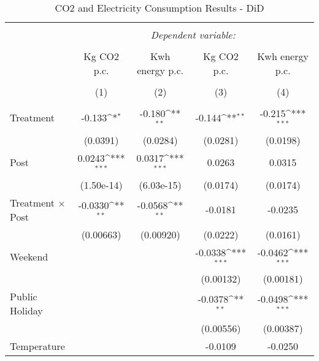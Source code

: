 \def\sym#1{\ifmmode^{#1}\else\(^{#1}\)\fi}

\begin{table}[!htbp] \centering 
  \caption{CO2 and Electricity Consumption Results - DiD} 
  \label{Main-DiD-Results} 
\small 
\def\sym#1{\ifmmode^{#1}\else\(^{#1}\)\fi}
\begin{tabular}{l*{4}{c}}
\\[-1.8ex]\hline 
\hline \\[-1.8ex] 
 & \multicolumn{4}{c}{\textit{Dependent variable:}} \\ 
\cline{2-5} 
\\[-1.8ex] &\multicolumn{1}{c}{Kg CO2 p.c.}&\multicolumn{1}{c}{Kwh energy p.c.}&\multicolumn{1}{c}{Kg CO2 p.c.}&\multicolumn{1}{c}{Kwh energy p.c.}\\ 
\\[-1.8ex] & \multicolumn{1}{c}{(1)} & \multicolumn{1}{c}{(2)} & \multicolumn{1}{c}{(3)} & \multicolumn{1}{c}{(4)}\\ 
\hline \\[-1.8ex] 
Treatment &      -0.133\sym{*}  &      -0.180\sym{**} &      -0.144\sym{**} &      -0.215\sym{***}\\
                    &    (0.0391)         &    (0.0284)         &    (0.0281)         &    (0.0198)         \\
[1em]
Post &      0.0243\sym{***}&      0.0317\sym{***}&      0.0263         &      0.0315         \\
                    &  (1.50e-14)         &  (6.03e-15)         &    (0.0174)         &    (0.0174)         \\
[1em]
Treatment $\times$ Post &     -0.0330\sym{**} &     -0.0568\sym{**} &     -0.0181         &     -0.0235         \\
                    &   (0.00663)         &   (0.00920)         &    (0.0222)         &    (0.0161)         \\
[1em]
Weekend &                     &                     &     -0.0338\sym{***}&     -0.0462\sym{***}\\
                    &                     &                     &   (0.00132)         &   (0.00181)         \\
[1em]
Public Holiday &                     &                     &     -0.0378\sym{**} &     -0.0498\sym{***}\\
                    &                     &                     &   (0.00556)         &   (0.00387)         \\
[1em]
Temperature &                     &                     &     -0.0109         &     -0.0250         \\

\end{tabular}
\end{table}
